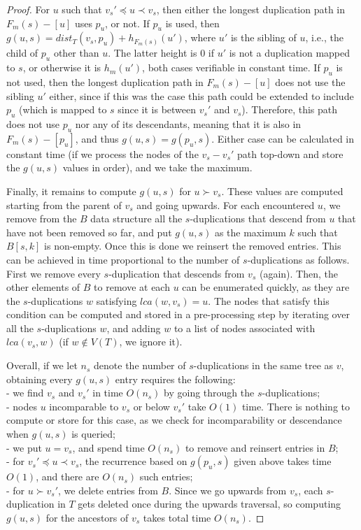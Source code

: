 \documentclass[10pt]{article}
\begin{document}
\begin{toappendix}
\begin{proof}
For $u$ such that $v_s' \preceq u \prec v_s$, then either the longest duplication path in $F_m(s) - [u]$ uses $p_u$, or not.  
If $p_u$ is used, then $g(u, s) = dist_T(v_s, p_u) + h_{F_m(s)}(u')$, where $u'$ is the sibling of $u$, i.e., the child of $p_u$ other than $u$.  The latter height is $0$ if $u'$ is not a duplication mapped to $s$, or otherwise it is $h_m(u')$, both cases verifiable in constant time.  If $p_u$ is not used, then the longest duplication path in  $F_m(s) - [u]$ does not use the sibling $u'$ either, since if this was the case this path could be extended to include $p_u$ (which is mapped to $s$ since it is between $v_s'$ and $v_s$). 
Therefore, this path does not use $p_u$ nor any of its descendants, meaning that it is also in $F_m(s) - [p_u]$, and thus $g(u, s) = g(p_u, s)$.  
Either case can be calculated in constant time (if we process the nodes of the $v_s - v_s'$ path top-down and store the $g(u, s)$ values in order), and we take the maximum.

Finally, it remains to compute $g(u, s)$ for $u \succ v_s$.  
These values are computed starting from the parent of $v_s$ and going upwards. 
For each encountered $u$, we remove from the $B$ data structure all the $s$-duplications that descend from $u$ that have not been removed so far, and 
put $g(u, s)$ as the maximum $k$ such that $B[s, k]$ is non-empty.  Once this is done we reinsert the removed entries.
This can be achieved in time proportional to the number of $s$-duplications as follows.  First we remove every $s$-duplication that descends from $v_s$ (again).
Then, the other elements of $B$ to remove at each $u$ can be enumerated quickly, as they are the $s$-duplications $w$ satisfying $lca(w, v_s) = u$.
The nodes that satisfy this condition can be computed and stored in a pre-processing step by iterating over all the $s$-duplications $w$, and adding $w$ to a list of nodes associated with $lca(v_s, w)$ (if $w \notin V(T)$, we ignore it).  

Overall, if we let $n_s$ denote the number of $s$-duplications in the same tree as $v$, obtaining every $g(u, s)$ entry requires the following:\\
- we find $v_s$ and $v_s'$ in time $O(n_s)$ by going through the $s$-duplications;\\
- nodes $u$ incomparable to $v_s$ or below $v_s'$ take $O(1)$ time.  There is nothing to compute or store for this case, as we check for incomparability or descendance when $g(u, s)$ is queried; \\
- we put $u = v_s$, and spend time $O(n_s)$ to remove and reinsert entries in $B$;\\
- for $v_s' \preceq u \prec v_s$, the recurrence based on $g(p_u, s)$ given above takes time $O(1)$, and there are $O(n_s)$ such entries; \\
- for $u \succ v_s'$, we delete entries from $B$.  Since we go upwards from $v_s$, each $s$-duplication in $T$
gets deleted once during the upwards traversal, so computing $g(u, s)$ for the ancestors of $v_s$ 
takes total time $O(n_s)$.


\end{proof}
\end{toappendix}
\end{document}
